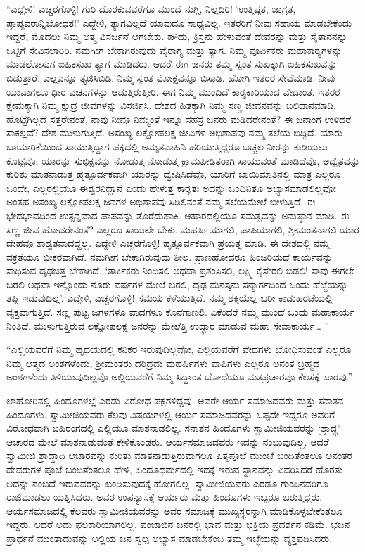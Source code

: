  “ಎದ್ದೇಳಿ! ಎಚ್ಚರಗೊಳ್ಳಿ! ಗುರಿ ದೊರಕುವವರೆಗೂ ಮುಂದೆ ನುಗ್ಗಿ, ನಿಲ್ಲದಿರಿ! ‘ಉತ್ತಿಷ್ಠತ, ಜಾಗ್ರತ, ಪ್ರಾಪ್ಯವರಾನ್ನಿಬೋಧತ!’ ಎದ್ದೇಳಿ, ತ್ಯಾಗವಿಲ್ಲದೆ ಯಾವುದೂ ಸಾಧ್ಯವಿಲ್ಲ. ಇತರರಿಗೆ ನೀವು ಸಹಾಯ ಮಾಡಬೇಕೆಂದು ಇದ್ದರೆ, ಮೊದಲು ನಿಮ್ಮ ಆತ್ಮ ವಿಸರ್ಜನೆ ಆಗಬೇಕು. ಹೌದು, ಕ್ರಿಸ್ತನು ಹೇಳುವಂತೆ ದೇವರನ್ನು ಮತ್ತು ಸೈತಾನನನ್ನು ಒಟ್ಟಿಗೆ ಸೇವಿಸಲಾರಿರಿ. ನಮಗೀಗ ಬೇಕಾಗಿರುವುದು ವೈರಾಗ್ಯ ಮತ್ತು ತ್ಯಾಗ. ನಿಮ್ಮ ಪೂರ್ವಿಕರು ಮಹಾಕಾರ‍್ಯಗಳನ್ನು ಮಾಡಲೋಸುಗ ಐಹಿಕಸುಖ ತ್ಯಾಗ ಮಾಡಿದರು. ಆದರೆ ಈಗ ಜನರು ತಮ್ಮ ಸ್ವಂತ ಸುಖಕ್ಕಾಗಿ ಐಹಿಕಸುಖವನ್ನು ಬಿಡುತ್ತಾರೆ. ಎಲ್ಲವನ್ನೂ ತ್ಯಜಿಸಿಬಿಡಿ. ನಿಮ್ಮ ಸ್ವಂತ ಮೋಕ್ಷವನ್ನೂ ಬಿಸಾಡಿ. ಹೋಗಿ ಇತರರ ಸೇವೆಮಾಡಿ. ನೀವು ಯಾವಾಗಲೂ ಧೀರ ವಚನಗಳನ್ನು ಆಡುತ್ತಿರುತ್ತೀರಿ. ಈಗ ನಿಮ್ಮ ಮುಂದಿದೆ ಕಾರ‍್ಯಕಾರಿಯಾದ ವೇದಾಂತ. ಇತರರ ಕ್ಷೇಮಕ್ಕಾಗಿ ನಿಮ್ಮ ಕ್ಷುದ್ರ ಜೀವಗಳನ್ನು ವಿಸರ್ಜಿಸಿ. ದೇಶದ ಹಿತಕ್ಕಾಗಿ ನಿಮ್ಮ ಸಣ್ಣ ಜೀವನವನ್ನು ಬಲಿದಾನಮಾಡಿ. ಹೊಟ್ಟೆಗಿಲ್ಲದೆ ಸತ್ತರೇನಂತೆ, ನಾವು ನೀವೂ ನಿಮ್ಮಂತೆ ಇನ್ನೂ ಸಹಸ್ರ ಜನರು ಮಡಿದರೇನಂತೆ? ಈ ಜನಾಂಗ ಉಳಿದರೆ ಸಾಕಲ್ಲವೆ? ದೇಶ ಮುಳುಗುತ್ತಿದೆ. ಅಸಂಖ್ಯ ಲಕ್ಷೋಪಲಕ್ಷ ಜೀವಿಗಳ ಅಭಿಶಾಪವು ನಮ್ಮ ತಲೆಯ ಬಿದ್ದಿದೆ. ಯಾರು ಬಾಯಾರಿಕೆಯಿಂದ ಸಾಯುತ್ತಿದ್ದಾಗ ಪಕ್ಕದಲ್ಲಿ ಅಮೃತವಾಹಿನಿ ಹರಿಯುತ್ತಿದ್ದರೂ ಬಚ್ಚಲ ನೀರನ್ನು ಕುಡಿಯಲು ಕೊಟ್ಟೆವೊ, ಯಾರನ್ನು ಸುಭಿಕ್ಷವನ್ನು ನೋಡುತ್ತ ನೋಡುತ್ತ ಕ್ಷಾಮಪೀಡಿತರಾಗಿ ಸಾಯುವಂತೆ ಮಾಡಿದೆವೊ, ಅದ್ವೈತವನ್ನು ಕುರಿತು ಮಾತನಾಡುತ್ತ ಹೃತ್ಪೂರ್ವಕವಾಗಿ ಯಾರನ್ನು ದ್ವೇಷಿಸಿದೆವೊ, ಯಾರಿಗೆ ಬಾಯಿಮಾತಿನಲ್ಲಿ ಮಾತ್ರ ಎಲ್ಲರೂ ಒಂದೇ, ಎಲ್ಲರಲ್ಲಿಯೂ ಈಶ್ವರನಿದ್ದಾನೆ ಎಂದು ಹೇಳುತ್ತ ಕಾರ‍್ಯತಃ ಅದನ್ನು ಒಂದಿನಿತೂ ಅಭ್ಯಾಸಮಾಡಲಿಲ್ಲವೋ ಅಂತಹ ಅಸಂಖ್ಯ ಲಕ್ಷೋಪಲಕ್ಷ ಜನಗಳ ಅಭಿಶಾಪವು ಸಿಡಿಲಿನಂತೆ ನಮ್ಮ ತಲೆಯಮೇಲೆ ಬೀಳುತ್ತಿದೆ. ಈ ಭೇದಭಾವದಿಂದ ಉತ್ಪನ್ನವಾದ ಪಾಪವನ್ನು ತೊರೆದುಹಾಕಿ. ಆಹಾರದಲ್ಲಿಯೂ ಸಮತ್ವವನ್ನು ಅನುಷ್ಠಾನ ಮಾಡಿ. ಈ ಸಣ್ಣ ಜೀವ ಹೋದರೇನಂತೆ? ಎಲ್ಲರೂ ಸಾಯಲೇ ಬೇಕು. ಮಹರ್ಷಿಯಾಗಲಿ, ಪಾಪಿಯಾಗಲಿ, ಶ‍್ರೀಮಂತನಾಗಲಿ ಯಾರ ದೇಹವೂ ಶಾಶ್ವತವಾದದ್ದಲ್ಲ. ಎದ್ದೇಳಿ ಎಚ್ಚರಗೊಳ್ಳಿ! ಹೃತ್ಪೂರ್ವಕವಾಗಿ ಪ್ರಯತ್ನ ಮಾಡಿ. ಈ ದೇಶದಲ್ಲಿ ನಮ್ಮ ವಕ್ರತೆಯೂ ಭೀಕರವಾಗಿದೆ. ನಮಗೀಗ ಬೇಕಾಗಿರುವುದು ಶೀಲ. ಪ್ರಾಣಹೋದರೂ ಹಿಂಜರಿಯದೆ ಕಾರ್ಯವನ್ನು ಸಾಧಿಸುವ ದೃಢಚಿತ್ತ ಬೇಕಾಗಿದೆ. ‘ತಾರ್ಕಿಕರು ನಿಂದಿಸಲಿ ಅಥವಾ ಪ್ರಶಂಸಿಸಲಿ, ಲಕ್ಷ್ಮಿ ಕೈಸೇರಲಿ ಬಿಡಲಿ! ಸಾವು ಈಗಲೇ ಬರಲಿ ಅಥವಾ ಇನ್ನೊಂದು ನೂರು ವರ್ಷಗಳ ಮೇಲೆ ಬರಲಿ, ದೃಢ ಮನಸ್ಕನು ಸನ್ಮಾರ್ಗದಿಂದ ಒಂದು ಹೆಜ್ಜೆಯನ್ನು ತಪ್ಪಿ ಇಡುವುದಿಲ್ಲ’. ಎದ್ದೇಳಿ, ಎಚ್ಚರಗೊಳ್ಳಿ! ಸಮಯ ಕಳೆಯುತ್ತಿದೆ. ನಮ್ಮ ಶಕ್ತಿಯೆಲ್ಲ ಬರೀ ಕಾಡುಹರಟೆಯಲ್ಲಿ ವ್ಯಕ್ತವಾಗುತ್ತಿದೆ. ಸಣ್ಣ ಪುಟ್ಟ ಜಗಳಗಳೂ ವಾದಗಳೂ ಕೊನೆಗಾಣಲಿ. ಏಕೆಂದರೆ ನಮ್ಮ ಮುಂದೆ ಒಂದು ಮಹಾಕಾರ್ಯ ನಿಂತಿದೆ. ಮುಳುಗುತ್ತಿರುವ ಲಕ್ಷೋಪಲಕ್ಷ ಜನರನ್ನು ಮೇಲೆತ್ತಿ ಉದ್ಧಾರ ಮಾಡುವ ಮಹಾ ಸೇವಾಕಾರ್ಯ… ” 

 “ಎಲ್ಲಿಯವರೆಗೆ ನಿಮ್ಮ ಹೃದಯದಲ್ಲಿ ಕನಿಕರ ಇರುವುದಿಲ್ಲವೋ, ಎಲ್ಲಿಯವರೆಗೆ ವೇದಗಳು ಬೋಧಿಸುವಂತೆ ಎಲ್ಲರೂ ನಿಮ್ಮ ಆತ್ಮದ ಅಂಶಗಳೆಂದು, ಶ‍್ರೀಮಂತರು ದರಿದ್ರದು ಮಹರ್ಷಿಗಳು ಪಾಪಿಗಳು ಎಲ್ಲರೂ ಅನಂತ ಬ್ರಹ್ಮದ ಅಂಶಗಳೆಂದು ತಿಳಿಯುವುದಿಲ್ಲವೊ ಅಲ್ಲಿಯವರೆಗೆ ನಿಮ್ಮ ಸಿದ್ಧಾಂತ ಬೋಧೆಯೂ ಮತಪ್ರಚಾರವೂ ಕೆಲಸಕ್ಕೆ ಬಾರವು.” 

 ಲಾಹೋರಿನಲ್ಲಿ ಹಿಂದೂಗಳಲ್ಲೆ ಎರಡು ವಿರೋಧ ಪಕ್ಷಗಳಿದ್ದವು. ಅವರೇ ಆರ್ಯ ಸಮಾಜದವರು ಮತ್ತು ಸನಾತನ ಹಿಂದೂಗಳು. ಸ್ವಾಮೀಜಿಯವರು ಕೆಲವು ವಿಷಯಗಳಲ್ಲಿ ಆರ್ಯ ಸಮಾಜದವರನ್ನು ಒಪ್ಪದೇ ಇದ್ದರೂ ಅವರಿಗೆ ವಿರೋಧವಾಗಿ ಬಹಿರಂಗದಲ್ಲಿ ಎಲ್ಲಿಯೂ ಮಾತನಾಡಲಿಲ್ಲ. ಸನಾತನ ಹಿಂದೂಗಳು ಸ್ವಾಮೀಜಿಯವರನ್ನು ‘ಶ್ರಾದ್ಧ’ ಆಚಾರದ ಮೇಲೆ ಮಾತನಾಡುವಂತೆ ಕೇಳಿಕೊಂಡರು. ಆರ್ಯಸಮಾಜದವರು ಇದನ್ನು ನಂಬುವುದಿಲ್ಲ. ಆದರೆ ಸ್ವಾಮೀಜಿ ಶ್ರಾದ್ಧಾದಿ ಆಚಾರವನ್ನು ಕುರಿತು ಮಾತನಾಡುತ್ತಿರುವಾಗಲೂ ಪಿತೃಪೂಜೆ ಮುಂಚೆ ಬಂದಿತೆಂತಲೂ ಅನಂತರ ದೇವರುಗಳ ಪೂಜೆ ಬಂದಿತೆಂತಲೂ ಹೇಳಿ, ಹಿಂದೂಧರ್ಮದಲ್ಲಿ ಇದಕ್ಕೆ ಇರುವ ಸ್ಥಾನವನ್ನು ವಿವರಿಸಿದರೆ ಹೊರತು ಅದನ್ನು ನಂಬದೆ ಇರುವವರನ್ನು ಖಂಡಿಸುವುದಕ್ಕೆ ಹೋಗಲಿಲ್ಲ. ಸ್ವಾಮೀಜಿಯವರು ಎರಡೂ ಗುಂಪಿನವರಿಗೂ ರಾಜಿಮಾಡಲು ಯತ್ನಿಸಿದರು. ಅವರ ಉಪನ್ಯಾಸಕ್ಕೆ ಆರ್ಯರು ಮತ್ತು ಹಿಂದೂಗಳು ಇಬ್ಬರೂ ಬರುತ್ತಿದ್ದರು. ಆರ್ಯಸಮಾಜದಲ್ಲಿ ಕೆಲವರು ಸ್ವಾಮೀಜಿಯವರನ್ನು ಅವರ ಸಮಾಜಕ್ಕೆ ಮುಖ್ಯಸ್ಥರನ್ನಾಗಿ ಮಾಡಿಕೊಳ್ಳಬೇಕೆಂತಲೂ ಇದ್ದರು. ಆದರೆ ಅದು ಫಲಕಾರಿಯಾಗಲಿಲ್ಲ. ಪಂಜಾಬಿನ ಜನರಲ್ಲಿ ಭಾವ ಮತ್ತು ಭಕ್ತಿಯ ಪ್ರದರ್ಶನ ಕಡಿಮೆ. ಭಜನ ಪ್ರಾರ್ಥನೆ ಮುಂತಾದುವನ್ನು ಅಲ್ಲಿಯ ಜನ ಸ್ವಲ್ಪ ಅಭ್ಯಾಸ ಮಾಡಬೇಕೆಂಬ ತಮ್ಮ ಇಚ್ಛೆಯನ್ನು ವ್ಯಕ್ತಪಡಿಸಿದರು. 

